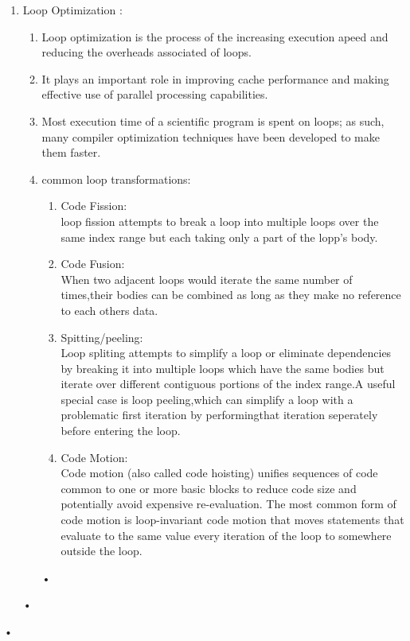 \documentclass[11pt]{article}
\begin{document}
\begin{enumerate}
\begin{enumerate}
\begin{enumerate}
			\end{enumerate}•
			
		\end{enumerate}•
		
		\item Loop Optimization :
		\begin{enumerate}
			\item Loop optimization is the process of the increasing execution apeed and reducing the overheads associated of loops.
			\item It plays an important role in improving cache performance and making effective use of parallel processing capabilities.
			\item Most execution time of a scientific program is spent on loops; as such, many compiler optimization techniques have been developed to make them faster.
			\item common loop transformations:
			\begin{enumerate}
				\item Code Fission:\\
				loop fission attempts to break a loop into multiple loops over the same index range but each taking only a part of the lopp’s body.
				\item Code Fusion:\\
				When two adjacent loops would iterate the same number of times,their bodies can be combined as long as they make no reference to each others data.
				\item Spitting/peeling:\\
				Loop spliting attempts to simplify a loop or eliminate dependencies by breaking it into multiple loops which have the same bodies but iterate over different contiguous portions of the index range.A useful special case is loop peeling,which can simplify a loop with a problematic first iteration by performingthat iteration seperately before entering the loop.
				\item Code Motion:\\
				Code motion (also called code hoisting) unifies sequences of code common to one or more basic blocks to reduce code size and potentially avoid expensive re-evaluation. The most common form of code motion is loop-invariant code motion that moves statements that evaluate to the same value every iteration of the loop to somewhere outside the loop.
				
			\end{enumerate}•
			
		\end{enumerate}•
		
	\end{enumerate}•
	
\end{document}
